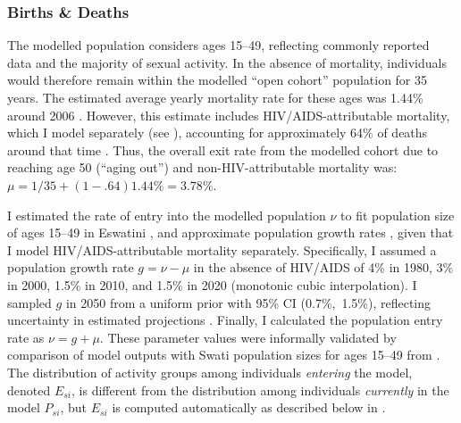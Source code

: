 \subsubsection{Births \& Deaths}\label{model.par.turnover.bd}
The modelled population considers ages 15--49,
reflecting commonly reported data and the majority of sexual activity.
In the absence of mortality, individuals would therefore
remain within the modelled ``open cohort'' population for 35 years.
The estimated average yearly mortality rate for these ages was 1.44\% around 2006
\cite[Table~15.2]{SDHS2006}.
However, this estimate includes HIV/AIDS-attributable mortality,
which I model separately (see ),
accounting for approximately 64\% of deaths around that time \cite{WHO2006EswMort}.
Thus, the overall exit rate from the modelled cohort
due to reaching age 50 (``aging out'') and non-HIV-attributable mortality was:
$\mu = 1/35 + (1-.64) 1.44\% = 3.78\%$.
\par
I estimated the rate of entry into the modelled population $\nu$
to fit population size of ages 15--49 in Eswatini \cite{WorldBank},
and approximate population growth rates \cite{UNWPP2019},
given that I model HIV/AIDS-attributable mortality separately.
Specifically, I assumed a population growth rate $g = \nu - \mu$ in the absence of HIV/AIDS of
4\% in 1980, 3\% in 2000, 1.5\% in 2010, and 1.5\% in 2020 (monotonic cubic interpolation).
I sampled $g$ in 2050 from a uniform prior with 95\% CI (0.7\%,~1.5\%),
reflecting uncertainty in estimated projections \cite{UNWPP2019}.
Finally, I calculated the population entry rate as $\nu = g + \mu$.
These parameter values were informally validated by comparison of model outputs with
Swati population sizes for ages 15--49 from \cite{WorldBank}.
The distribution of activity groups among individuals \emph{entering} the model, denoted $E_{si}$,
is different from the distribution among individuals \emph{currently} in the model $P_{si}$,
but $E_{si}$ is computed automatically as described below in .
